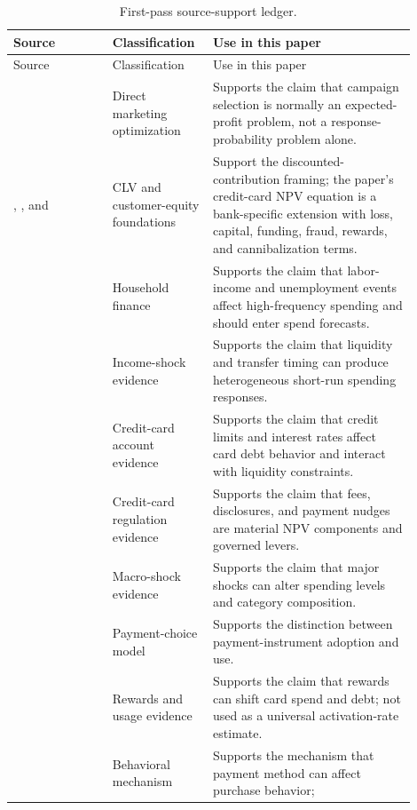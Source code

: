 \documentclass[11pt]{article}
\newcommand{\1}{\mathbf{1}}
\begin{document}
\begin{longtable}{p{0.23\linewidth}p{0.20\linewidth}p{0.47\linewidth}}
\caption{First-pass source-support ledger.}
\label{tab:source-support}\\
\toprule
Source & Classification & Use in this paper \\
\midrule
\endfirsthead
\toprule
Source & Classification & Use in this paper \\
\midrule
\endhead
\citet{bult1995directmail}
  & Direct marketing optimization
  & Supports the claim that campaign selection is normally an expected-profit
    problem, not a response-probability problem alone. \\
\citet{berger1998clv}, \citet{rust2004return}, and \citet{venkatesan2004clv}
  & CLV and customer-equity foundations
  & Support the discounted-contribution framing; the paper's credit-card NPV
    equation is a bank-specific extension with loss, capital, funding, fraud,
    rewards, and cannibalization terms. \\
\citet{ganong2019unemployment}
  & Household finance
  & Supports the claim that labor-income and unemployment events affect
    high-frequency spending and should enter spend forecasts. \\
\citet{johnson2004rebates}
  & Income-shock evidence
  & Supports the claim that liquidity and transfer timing can produce
    heterogeneous short-run spending responses. \\
\citet{gross2001liquidity}
  & Credit-card account evidence
  & Supports the claim that credit limits and interest rates affect card debt
    behavior and interact with liquidity constraints. \\
\citet{agarwal2013cardact}
  & Credit-card regulation evidence
  & Supports the claim that fees, disclosures, and payment nudges are material
    NPV components and governed levers. \\
\citet{baker2020epidemic}
  & Macro-shock evidence
  & Supports the claim that major shocks can alter spending levels and
    category composition. \\
\citet{koulayev2012payment}
  & Payment-choice model
  & Supports the distinction between payment-instrument adoption and use. \\
\citet{agarwal2010rewards}
  & Rewards and usage evidence
  & Supports the claim that rewards can shift card spend and debt; not used as a
    universal activation-rate estimate. \\
\citet{prelec2001creditcard}
  & Behavioral mechanism
  & Supports the mechanism that payment method can affect purchase behavior;

\end{longtable}
\end{document}
